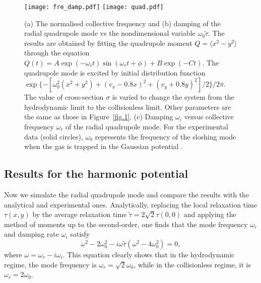 \begin{figure}[tbp]
\center
\texttt{[image: fre\_damp.pdf]}
\texttt{[image: quad.pdf]} 
\caption[(a) The normalised collective frequency and (b) damping of the radial quadrupole mode vs the nondimensional variable $\omega_0\widetilde{\tau}$. (c) Damping $\omega_i$ versus collective frequency $\omega_r$ of the radial quadrupole mode. ]{ (a) The normalised collective frequency and (b) damping of the radial quadrupole mode vs the nondimensional variable $\omega_0\widetilde{\tau}$. The results are obtained by fitting the quadrupole moment $Q=\langle x^2-y^2\rangle$ through the equation $Q(t)=A\exp(-\omega_i t)\sin(\omega_rt+\phi)+B\exp(-Ct)$. The quadrupole mode is excited by initial distribution function $\exp\{-[\omega_0^2(x^2+y^2)+(v_x-0.8x)^2+(v_y+0.8y)^2]/2\}/2\pi$. The value of cross-section $\sigma$ is varied to change the system from the hydrodynamic limit to the collisionless limit. Other parameters are the same as those in Figure~\ref{fig.1}. (c) Damping $\omega_i$ versus collective frequency $\omega_r$ of the radial quadrupole mode. For the experimental data (solid circles), $\omega_0$ represents the frequency of the sloshing mode when the gas is trapped in the Gaussian potential \cite{Riedl2008}.}
\label{fig.2}
\end{figure}


\subsection{Results for the harmonic potential}


Now we simulate the radial quadrupole mode and compare the results with the analytical and experimental ones. Analytically, replacing the local relaxation time $\tau(x,y)$ by the average relaxation time $\widetilde{\tau}=2\sqrt{2}\tau(0,0)$ and applying the method of moments up to the second-order, one finds that the mode frequency $\omega_r$ and damping rate $\omega_i$ satisfy~\cite{AlKhawaja2000, Buggle2005}
\begin{equation}\label{quad}
    \omega^2-2\omega_0^2
-i\omega\widetilde{\tau}(\omega^2-4\omega_0^2)=0,
\end{equation}
where $\omega=\omega_r-i\omega_i$. This equation clearly shows that in the hydrodynamic regime, the mode frequency is $\omega_r=\sqrt{2}\omega_0$, while in the collisionless regime, it is $\omega_r=2\omega_0$.



